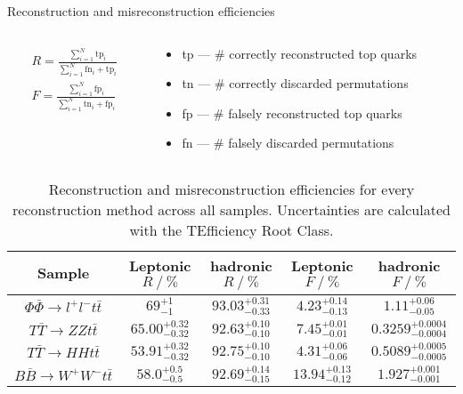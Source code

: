 \documentclass[aspectratio=1610, professionalfonts, 9pt]{beamer}
\begin{document}
\begin{frame}{Reconstruction and misreconstruction efficiencies}
    \begin{columns}
        \begin{column}{0.5\textwidth}
            \begin{align*}
                R = \frac{\sum_{i = 1}^{N}\mathrm{tp}_i}{\sum_{i = 1}^{N}\mathrm{fn}_i + \mathrm{tp}_i} \\
                F = \frac{\sum_{i = 1}^{N}\mathrm{fp}_i}{\sum_{i = 1}^{N}\mathrm{tn}_i + \mathrm{fp}_i}
            \end{align*}
        \end{column}
        \begin{column}{0.5\textwidth}
            \begin{itemize}
                \item tp --- \# correctly reconstructed top quarks
                \item tn --- \# correctly discarded permutations
                \item fp --- \# falsely reconstructed top quarks
                \item fn --- \# falsely discarded permutations
            \end{itemize}
        \end{column}
    \end{columns}

    \begin{table}
        \centering
        \caption{Reconstruction and misreconstruction efficiencies for every reconstruction method across all samples. Uncertainties are calculated with the TEfficiency Root Class.}
        \label{tab:acc}
        \begin{tabular}{ccccc}
            \toprule
            {Sample} & {Leptonic \(R\mathrel{/}\si{\percent}\)} & {hadronic \(R\mathrel{/}\si{\percent}\)} & {Leptonic \(F\mathrel{/}\si{\percent}\)} & {hadronic \(F\mathrel{/}\si{\percent}\)}\\
            \midrule
            \(\Phi \bar{\Phi} \rightarrow l^+l^-t\bar{t}\) & \(69^{+1}_{-1}\) & \(93.03^{+0.31}_{-0.33}\) & \(4.23^{+0.14}_{-0.13}\) & \(1.11^{+0.06}_{-0.05}\)\\
            \(T\bar{T}\rightarrow ZZt\bar{t}\) & \(65.00^{+0.32}_{-0.32}\) & \(92.63^{+0.10}_{-0.10}\) & \(7.45^{+0.01}_{-0.01}\) & \(0.3259^{+0.0004}_{-0.0004}\)\\
            \(T\bar{T}\rightarrow HHt\bar{t}\) & \(53.91^{+0.32}_{-0.32}\)& \(92.75^{+0.10}_{-0.10}\) & \(4.31^{+0.06}_{-0.06}\) & \( 0.5089^{+0.0005}_{-0.0005}\)\\
            \(B\bar{B}\rightarrow W^+W^-t\bar{t}\) & \(58.0^{+0.5}_{-0.5}\) & \(92.69^{+0.14}_{-0.15}\) & \(13.94^{+0.13}_{-0.12}\) & \(1.927^{+0.001}_{-0.001}\)\\
            \bottomrule
        \end{tabular}
    \end{table}
\end{frame}
\end{document}
